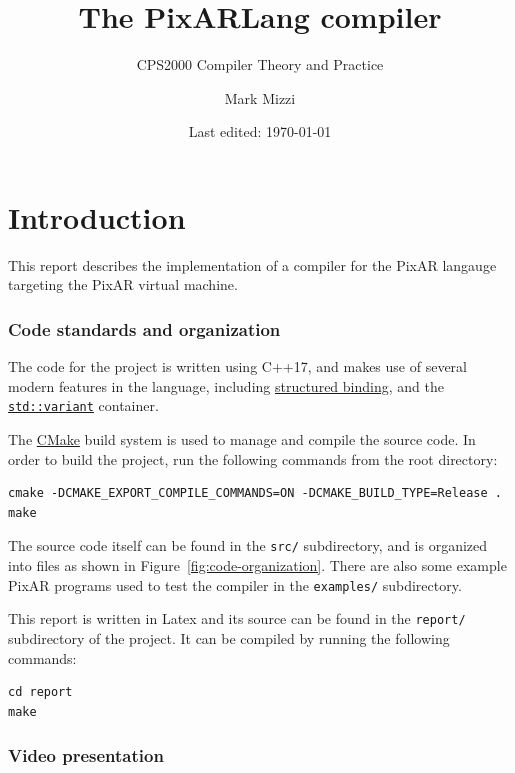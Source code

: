 \documentclass[11pt,a4paper]{scrartcl}
\title{The PixARLang compiler}
\subtitle{CPS2000 Compiler Theory and Practice}
\author{Mark Mizzi}
\date{Last edited: \today}
\begin{document}
\maketitle

\tableofcontents

\newpage

\section{Introduction}

This report describes the implementation of a compiler for the PixAR langauge targeting the PixAR virtual machine.

\subsubsection{Code standards and organization}

The code for the project is written using C++17, and makes use of several modern features in the language, including \href{https://en.cppreference.com/mwiki/index.php?title=cpp/language/structured_binding&oldid=150915}{structured binding}, and the \href{https://en.cppreference.com/mwiki/index.php?title=cpp/utility/variant&oldid=150622}{\verb|std::variant|} container.

The \href{https://cmake.org}{CMake} build system is used to manage and compile the source code. In order to build the project, run the following commands from the root directory:
\begin{verbatim}
cmake -DCMAKE_EXPORT_COMPILE_COMMANDS=ON -DCMAKE_BUILD_TYPE=Release .
make
\end{verbatim}

The source code itself can be found in the \verb|src/| subdirectory, and is organized into files as shown in Figure~\ref{fig:code-organization}. There are also some example PixAR programs used to test the compiler in the \verb|examples/| subdirectory.

This report is written in Latex and its source can be found in the \verb|report/| subdirectory of the project. It can be compiled by running the following commands:
\begin{verbatim}
cd report
make
\end{verbatim}

\subsubsection{Video presentation}
\end{document}
